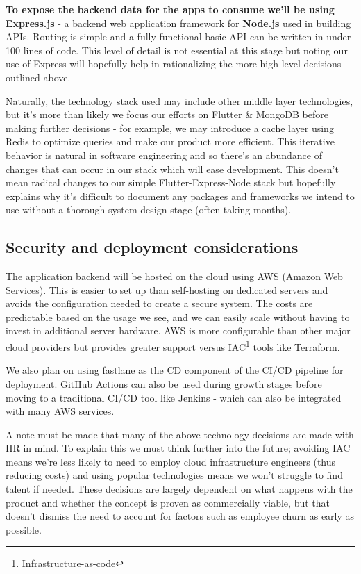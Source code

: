 \textbf{To expose the backend data for the apps to consume 
we'll be using Express.js} - a backend web application
framework for \textbf{Node.js} used in building APIs. Routing is simple and a fully functional
basic API can be written in under 100 lines of code. This level of detail
is not essential at this stage but noting our use of Express will hopefully
help in rationalizing the more high-level decisions outlined above.
\par
Naturally, the technology stack used may include other middle layer
technologies, but it's more than likely we focus our efforts on
Flutter \& MongoDB before making further decisions -
for example, we may introduce a cache layer using Redis to optimize
queries and make our product more efficient. This iterative behavior is natural in 
software engineering and so there's an abundance of changes that can occur in our stack which will ease
development. This doesn't mean radical changes to our simple Flutter-Express-Node stack
but hopefully explains why it's difficult to document any packages and frameworks
we intend to use without a thorough system design stage (often taking months).
\vspace{-5mm}
\subsection{Security and deployment considerations}
The application backend will be hosted on the cloud using
AWS (Amazon Web Services). This is easier to set up than
self-hosting on dedicated servers and avoids the configuration needed to create
a secure system. The costs are predictable based on the usage we see, and
we can easily scale without having to invest in additional server hardware.
AWS is more configurable than other major cloud providers
but provides greater support versus IAC\footnote{Infrastructure-as-code}
tools like Terraform.
\par
We also plan on using fastlane as the CD component of the CI/CD pipeline for deployment.
GitHub Actions can also be used during growth stages before moving to a traditional
CI/CD tool like Jenkins - which can also be integrated with many AWS services. 
\par
A note must be made that many of the above technology decisions are made with HR in mind.
To explain this we must think further into the future; avoiding IAC means we're less likely
to need to employ cloud infrastructure engineers (thus reducing costs) and using popular technologies means
we won't struggle to find talent if needed. These decisions 
are largely dependent on what happens with the product and whether the concept
is proven as commercially viable, but that doesn't dismiss the need to account for factors
such as employee churn as early as possible.
